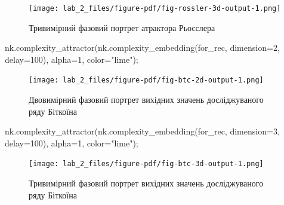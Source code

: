 \documentclass[
  letterpaper,
]{report}
\newenvironment{Shaded}{\begin{snugshade}}{\end{snugshade}}
\newcommand{\DecValTok}[1]{\textcolor[rgb]{0.68,0.00,0.00}{#1}}
\newcommand{\NormalTok}[1]{\textcolor[rgb]{0.00,0.23,0.31}{#1}}
\newcommand{\OperatorTok}[1]{\textcolor[rgb]{0.37,0.37,0.37}{#1}}
\newcommand{\StringTok}[1]{\textcolor[rgb]{0.13,0.47,0.30}{#1}}
\begin{document}
\begin{figure}[H]

{\centering \texttt{[image: lab\_2\_files/figure-pdf/fig-rossler-3d-output-1.png]}

}

\caption{\label{fig-rossler-3d}Тривимірний фазовий портрет атрактора
Рьосслера}

\end{figure}

\begin{Shaded}
\begin{Highlighting}[]
\NormalTok{nk.complexity\_attractor(nk.complexity\_embedding(for\_rec, dimension}\OperatorTok{=}\DecValTok{2}\NormalTok{, delay}\OperatorTok{=}\DecValTok{100}\NormalTok{), }
\NormalTok{                        alpha}\OperatorTok{=}\DecValTok{1}\NormalTok{, }
\NormalTok{                        color}\OperatorTok{=}\StringTok{"lime"}\NormalTok{)}\OperatorTok{;} 
\end{Highlighting}
\end{Shaded}

\begin{figure}[H]

{\centering \texttt{[image: lab\_2\_files/figure-pdf/fig-btc-2d-output-1.png]}

}

\caption{\label{fig-btc-2d}Двовимірний фазовий портрет вихідних значень
досліджуваного ряду Біткоїна}

\end{figure}

\begin{Shaded}
\begin{Highlighting}[]
\NormalTok{nk.complexity\_attractor(nk.complexity\_embedding(for\_rec, dimension}\OperatorTok{=}\DecValTok{3}\NormalTok{, delay}\OperatorTok{=}\DecValTok{100}\NormalTok{), }
\NormalTok{                        alpha}\OperatorTok{=}\DecValTok{1}\NormalTok{, }
\NormalTok{                        color}\OperatorTok{=}\StringTok{"lime"}\NormalTok{)}\OperatorTok{;} 
\end{Highlighting}
\end{Shaded}

\begin{figure}[H]

{\centering \texttt{[image: lab\_2\_files/figure-pdf/fig-btc-3d-output-1.png]}

}

\caption{\label{fig-btc-3d}Тривимірний фазовий портрет вихідних значень
досліджуваного ряду Біткоїна}

\end{figure}
\end{document}
